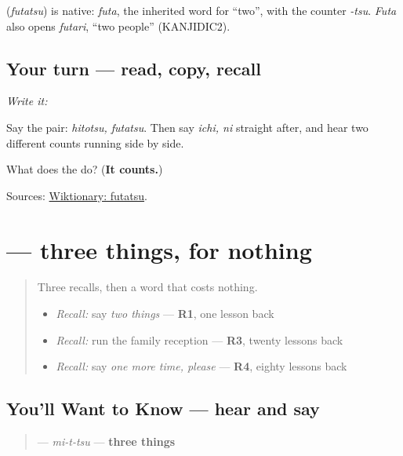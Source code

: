 \begin{cousinweb}
\textbf{} (\emph{futatsu}) is native: \emph{futa}, the inherited word for \textquotedblleft{}two\textquotedblright{}, with the counter \emph{-tsu}. \emph{Futa} also opens \emph{futari}, \textquotedblleft{}two people\textquotedblright{} (KANJIDIC2).
\end{cousinweb}

\subsection*{Your turn — read, copy, recall}
\emph{Write it:} \textbf{}

Say the pair: \emph{hitotsu, futatsu}. Then say \emph{ichi, ni} straight after, and hear two different counts running side by side.

\begin{tcolorbox}[breakable,colback=teal!4,colframe=teal!35!black,title={Before you move on}]
What does the \textbf{} do? (\textbf{It counts.})

Sources: \href{https://en.wiktionary.org/wiki/\%E4\%BA\%8C\%E3\%81\%A4}{Wiktionary: futatsu}.
\end{tcolorbox}
\section[\texorpdfstring{\ja{みっつ} (mittsu)}{みっつ (mittsu)}]{ — three things, for nothing}

\label{lesson:JA-C16-mittsu}



\begin{quote}
Three recalls, then a word that costs nothing.

\begin{itemize}
\raggedright
  \item \emph{Recall:} say \emph{two things} — \textbf{R1}, one lesson back
  \item \emph{Recall:} run the family reception — \textbf{R3}, twenty lessons back
  \item \emph{Recall:} say \emph{one more time, please} — \textbf{R4}, eighty lessons back
\end{itemize}
\end{quote}

\subsection*{You'll Want to Know — hear and say}
\begin{quote}
\textbf{} — \emph{mi-t-tsu} — \textbf{three things}
\end{quote}

